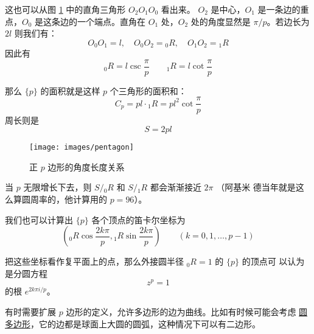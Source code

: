 \documentclass[cs4size,a4paper,adobefonts,openany]{ctexbook}
\newcommand{\pname}[1]{\underline{#1}}
\numberwithin{equation}{section}
\begin{document}
这也可以从图 \ref{fig:pentagon} 中的直角三角形 $O_2O_1O_0$ 看出来。
$O_2$ 是中心，$O_1$ 是一条边的重点，$O_0$ 是这条边的一个端点。直角在
$O_1$ 处，$O_2$ 处的角度显然是 $\pi/p$。若边长为 $2l$ 则我们有：
\[
O_0O_1=l,\quad O_0O_2={_0R}, \quad O_1O_2={_1R}
\]
因此有
\begin{equation}
  {_0R}=l\csc\frac{\pi}{p}\qquad {_1R}=l\cot\frac{\pi}{p}
\end{equation}

那么 $\{p\}$ 的面积就是这样 $p$ 个三角形的面积和：
\begin{equation}
  C_p = pl\cdot {_1R} = pl^2\cot\frac{\pi}{p}
\end{equation}
周长则是
\begin{equation}
  S=2pl
\end{equation}

\begin{figure}[htbp]
  \centering \texttt{[image: images/pentagon]}
  \caption{正 $p$ 边形的角度长度关系} \label{fig:pentagon}
\end{figure}

当 $p$ 无限增长下去，则 $S/{_0R}$ 和 $S/{_1R}$ 都会渐渐接近 $2\pi$ （阿基米
  德当年就是这么算圆周率的，他计算用的 $p=96$）。

我们也可以计算出 $\{p\}$ 各个顶点的笛卡尔坐标为
\[
\left({_0R}\cos\frac{2k\pi}{p},{_1R}\sin\frac{2k\pi}{p}\right)\qquad(k=0,1,\dots,p-1)
\]

把这些坐标看作复平面上的点，那么外接圆半径 ${_0R}=1$ 的 $\{p\}$ 的顶点可
以认为是分圆方程
\begin{equation}
  z^p=1
\end{equation}
的根 $e^{2k\pi i/p}$。

有时需要扩展 $p$ 边形的定义，允许多边形的边为曲线。比如有时候可能会考虑
\pname{圆多边形}，它的边都是球面上大圆的圆弧，这种情况下可以有二边形。
\end{document}

